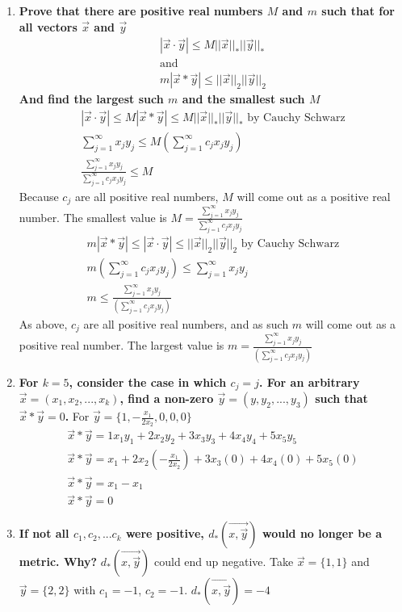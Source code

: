 \documentclass{article}
\begin{document}
\begin{enumerate}[label = \textbf{\alph*)}]
    \item \textbf{Prove that there are positive real numbers $M$ and $m$ such that for all vectors $\vec{x}$ and $\vec{y}$}\begin{align*}
        |\vec{x} \cdot \vec{y}| \le M||\vec{x}||_*||\vec{y}||_* \\   \text{and}\\
        m|\vec{x} * \vec{y}| \le ||\vec{x}||_2||\vec{y}||_2
    \end{align*}
    \textbf{And find the largest such $m$ and the smallest such $M$}
    \begin{align*}
        |\vec{x} \cdot \vec{y}| \le M|\vec{x} * \vec{y}| \le M||\vec{x}||_*||\vec{y}||_* \text{  by Cauchy Schwarz}\\
        \sum^\infty_{j=1}x_jy_j \le M(\sum^\infty_{j=1}c_jx_jy_j)\\
        \frac{\sum^\infty_{j=1}x_jy_j}{\sum^\infty_{j=1}c_jx_jy_j} \le M
    \end{align*}
    Because $c_j$ are all positive real numbers, $M$ will come out as a positive real number. The smallest value is $M =\frac{\sum^\infty_{j=1}x_jy_j}{\sum^\infty_{j=1}c_jx_jy_j}$
    \begin{align*}
        m|\vec{x} * \vec{y}| \le |\vec{x} \cdot \vec{y}| \le ||\vec{x}||_2||\vec{y}||_2 \text{  by Cauchy Schwarz}\\
        m(\sum^\infty_{j=1}c_jx_jy_j) \le  \sum^\infty_{j=1}x_jy_j\\
        m \le \frac{ \sum^\infty_{j=1}x_jy_j}{(\sum^\infty_{j=1}c_jx_jy_j)} 
    \end{align*}
    As above, $c_j$ are all positive real numbers, and as such $m$ will come out as a positive real number. The largest value is $m =\frac{ \sum^\infty_{j=1}x_jy_j}{(\sum^\infty_{j=1}c_jx_jy_j)}$
    \item \textbf{For $k = 5$, consider the case in which $c_j = j$. For an arbitrary $\vec{x} = (x_1,x_2,...,x_k)$, find a non-zero $\vec{y} = (y,y_2,...,y_3)$ such that $\vec{x} * \vec{y} = 0$.}
    For $\vec{y} = \{1,-\frac{x_1}{2x_2},0,0,0\}$ \begin{align*}
        \vec{x} * \vec{y} = 1x_1y_1 + 2x_2y_2 + 3x_3y_3 + 4x_4y_4 + 5x_5y_5\\
        \vec{x} * \vec{y} = x_1 + 2x_2(-\frac{x_1}{2x_2}) + 3x_3(0) + 4x_4(0) + 5x_5(0)\\
        \vec{x} * \vec{y} = x_1 - x_1\\
        \vec{x} * \vec{y} = 0
    \end{align*}
    \item \textbf{If not all $c_1,c_2,...c_k$ were positive, $d_*(\vec{x,\vec{y}})$ would no longer be a metric. Why?}
    $d_*(\vec{x,\vec{y}})$ could end up negative. Take $\vec{x} = \{1,1\}$ and $\vec{y} = \{2,2\}$ with $c_1 = -1$, $c_2 = -1$. $d_*(\vec{x,\vec{y}}) = -4$

\end{enumerate}
    
\end{document}
